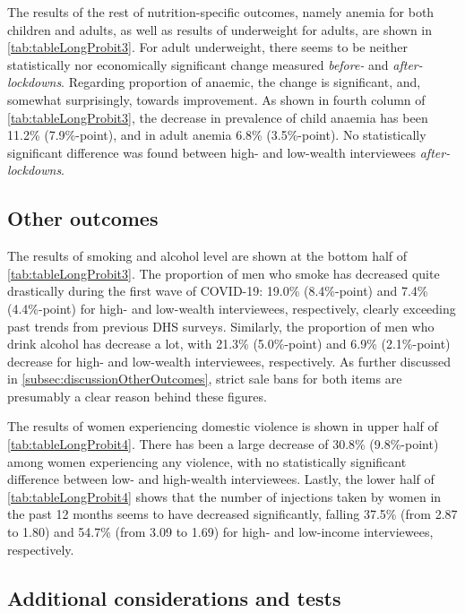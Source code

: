 \documentclass[12pt,a4paper,notitlepage]{article}
\begin{document}
The results of the rest of nutrition-specific outcomes, namely anemia for both children and adults, as well as results of underweight for adults, are shown in \cref{tab:tableLongProbit3}. For adult underweight, there seems to be neither statistically nor economically significant change measured \textit{before-} and \textit{after-lockdowns}. Regarding proportion of anaemic, the change is significant, and, somewhat surprisingly, towards improvement. As shown in fourth column of \cref{tab:tableLongProbit3}, the decrease in prevalence of child anaemia has been 11.2\% (7.9\%-point), and in adult anemia 6.8\% (3.5\%-point). No statistically significant difference was found between high- and low-wealth interviewees \textit{after-lockdowns}.

\subsection{Other outcomes} \label{subsec:resultsOtherOutcomes}

The results of smoking and alcohol level are shown at the bottom half of \cref{tab:tableLongProbit3}. The proportion of men who smoke has decreased quite drastically during the first wave of COVID-19: 19.0\% (8.4\%-point) and 7.4\% (4.4\%-point) for high- and low-wealth interviewees, respectively, clearly exceeding past trends from previous DHS surveys. Similarly, the proportion of men who drink alcohol has decrease a lot, with 21.3\% (5.0\%-point) and 6.9\% (2.1\%-point) decrease for high- and low-wealth interviewees, respectively. As further discussed in \cref{subsec:discussionOtherOutcomes}, strict sale bans for both items are presumably a clear reason behind these figures.

The results of women experiencing domestic violence is shown in upper half of \cref{tab:tableLongProbit4}. There has been a large decrease of 30.8\% (9.8\%-point) among women experiencing any violence, with no statistically significant difference between low- and high-wealth interviewees. Lastly, the lower half of \cref{tab:tableLongProbit4} shows that the number of injections taken by women in the past 12 months seems to have decreased significantly, falling 37.5\% (from 2.87 to 1.80) and 54.7\% (from 3.09 to 1.69) for high- and low-income interviewees, respectively.

\subsection{Additional considerations and tests} \label{subsec:additionaltests}
\end{document}

